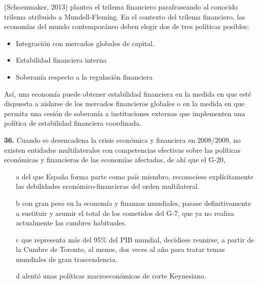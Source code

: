 \documentclass{nuevotema}
\begin{document}
\conceptos





(Schoenmaker, 2013) plantea el trilema financiero parafraseando al conocido trilema atribuido a Mundell-Fleming. En el contexto del trilema financiero, las economías del mundo contemporáneo deben elegir dos de tres políticas posibles:
\begin{itemize}
	\item Integración con mercados globales de capital.
	\item Estabilidad financiera interna
	\item Soberanía respecto a la regulación financiera
\end{itemize}

Así, una economía puede obtener estabilidad financiera en la medida en que esté dispuesta a aislarse de los mercados financieros globales o en la medida en que permita una cesión de soberanía a  instituciones externas que implementen una política de estabilidad financiera coordinada.

\preguntas

\textbf{36.} Cuando se desencadena la crisis económica y financiera en 2008/2009, no existen entidades multilaterales con competencias efectivas sobre las políticas económicas y financieras de las economías afectadas, de ahí que el G-20,

\begin{itemize}
	\item[a] del que España forma parte como país miembro, reconociese explícitamente las debilidades económico-financieras del orden multilateral.
	\item[b] con gran peso en la economía y finanzas mundiales, pasase definitivamente a sustituir y asumir el total de los cometidos del G-7, que ya no realiza actualmente las cumbres habituales.
	\item[c] que representa más del 95\% del PIB mundial, decidiese reunirse, a partir de la Cumbre de Toronto, al menos, dos veces al año para tratar temas mundiales de gran trascendencia.
	\item[d] alentó unas políticas macroeconómicas de corte Keynesiano.
\end{itemize}

\end{document}

